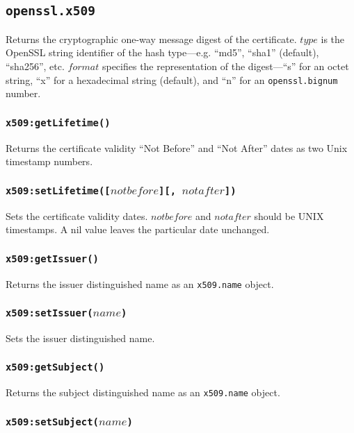 \documentclass[11pt, oneside]{memoir}
\newcommand*{\fn}[1]{\texttt{#1}\xspace}
\newcommand*{\module}[1]{\texttt{#1}\xspace}
\newcounter{toccols}
\newenvironment{Module}[1]{
	\subsection{\texttt{#1}}
	\addtocontents{toc}{
		\protect\begin{multicols}{\value{toccols}}
	}
}{
	\addtocontents{toc}{\protect\end{multicols}}
}
\begin{document}
\begin{Module}{openssl.x509}
Returns the cryptographic one-way message digest of the certificate. $type$ is the OpenSSL string identifier of the hash type---e.g. ``md5'', ``sha1'' (default), ``sha256'', etc. $format$ specifies the representation of the digest---``s'' for an octet string, ``x'' for a hexadecimal string (default), and ``n'' for an \module{openssl.bignum} number.

\subsubsection[\fn{x509:getLifetime}]{\fn{x509:getLifetime()}}

Returns the certificate validity ``Not Before'' and ``Not After'' dates as two Unix timestamp numbers.

\subsubsection[\fn{x509:setLifetime}]{\fn{x509:setLifetime([$notbefore$][, $notafter$])}}

Sets the certificate validity dates. $notbefore$ and $notafter$ should be UNIX timestamps. A nil value leaves the particular date unchanged.

\subsubsection[\fn{x509:getIssuer}]{\fn{x509:getIssuer()}}

Returns the issuer distinguished name as an \module{x509.name} object.

\subsubsection[\fn{x509:setIssuer}]{\fn{x509:setIssuer($name$)}}

Sets the issuer distinguished name.

\subsubsection[\fn{x509:getSubject}]{\fn{x509:getSubject()}}

Returns the subject distinguished name as an \module{x509.name} object.

\subsubsection[\fn{x509:setSubject}]{\fn{x509:setSubject($name$)}}


\end{Module}
\end{document}
